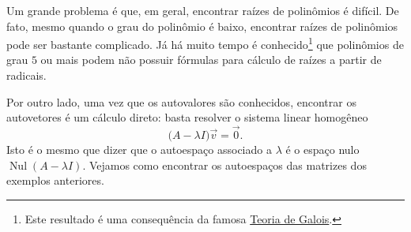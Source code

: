 \documentclass[../livro.tex]{subfiles}  %
\begin{document}
Um grande problema é que, em geral, encontrar raízes de polinômios é difícil. De fato, mesmo quando o grau do polinômio é baixo, encontrar raízes de polinômios pode ser bastante complicado. Já há muito tempo é conhecido\footnote{Este resultado é uma consequência da famosa \href{https://pt.wikipedia.org/wiki/Teoria_de_Galois}{Teoria de Galois}.} que polinômios de grau $5$ ou mais podem não possuir fórmulas para cálculo de raízes a partir de radicais.

Por outro lado, uma vez que os autovalores são conhecidos, encontrar os autovetores é um cálculo direto: basta resolver o sistema linear homogêneo
\begin{equation}
\big( A - \lambda I \big) \vec{v} = \vec{0}.
\end{equation} Isto é o mesmo que dizer que o autoespaço associado a $\lambda$ é o espaço nulo $\operatorname{Nul} (A - \lambda I)$. Vejamos como encontrar os autoespaços das matrizes dos exemplos anteriores.
\end{document}
